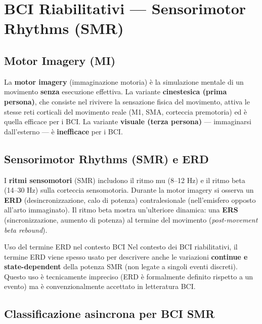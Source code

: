 \section{BCI Riabilitativi — Sensorimotor Rhythms (SMR)}

\subsection{Motor Imagery (MI)}

\begin{definizione}
La \textbf{motor imagery} (immaginazione motoria) è la simulazione mentale di un movimento \textbf{senza} esecuzione effettiva. La variante \textbf{cinestesica (prima persona)}, che consiste nel rivivere la sensazione fisica del movimento, attiva le stesse reti corticali del movimento reale (M1, SMA, corteccia premotoria) ed è quella efficace per i BCI. La variante \textbf{visuale (terza persona)} — immaginarsi dall'esterno — è \textbf{inefficace} per i BCI.
\end{definizione}

\subsection{Sensorimotor Rhythms (SMR) e ERD}

I \textbf{ritmi sensomotori} (SMR) includono il ritmo mu (8--12 Hz) e il ritmo beta (14--30 Hz) sulla corteccia sensomotoria. Durante la motor imagery si osserva un \textbf{ERD} (desincronizzazione, calo di potenza) contralesionale (nell'emisfero opposto all'arto immaginato). Il ritmo beta mostra un'ulteriore dinamica: una \textbf{ERS} (sincronizzazione, aumento di potenza) al termine del movimento (\textit{post-movement beta rebound}).

\begin{approfondimento}{Uso del termine ERD nel contesto BCI}
Nel contesto dei BCI riabilitativi, il termine ERD viene spesso usato per descrivere anche le variazioni \textbf{continue e state-dependent} della potenza SMR (non legate a singoli eventi discreti). Questo uso è tecnicamente impreciso (ERD è formalmente definito rispetto a un evento) ma è convenzionalmente accettato in letteratura BCI.
\end{approfondimento}

\subsection{Classificazione asincrona per BCI SMR}

